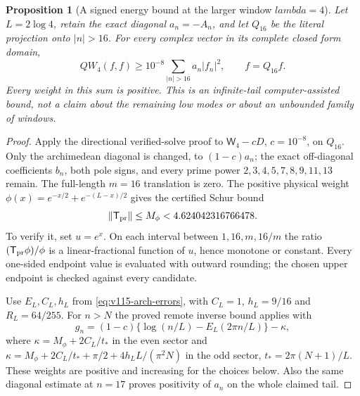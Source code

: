\documentclass[11pt]{article}
\def\lambda{lambda}%
\newtheorem{proposition}[theorem]{Proposition}
\theoremstyle{remark}
\begin{document}
\begin{proposition}[A signed energy bound at the larger window $\lambda=4$]
\label{prop:v120-lambda4-tail}
Let $L=2\log4$, retain the exact diagonal $a_n=-A_n$, and let
$Q_{16}$ be the literal projection onto $|n|>16$. For every complex
vector in its complete closed form domain,
\begin{equation}\label{eq:v120-lambda4-tail}
 QW_4(f,f)\ge10^{-8}\sum_{|n|>16}a_n|f_n|^2,
 \qquad f=Q_{16}f.
\end{equation}
Every weight in this sum is positive. This is an infinite-tail
computer-assisted bound, not a claim about the remaining low modes
or about an unbounded family of windows.
\end{proposition}
\begin{proof}
Apply the directional verified-solve proof to
$\mathsf W_4-cD$, $c=10^{-8}$, on $Q_{16}$.
Only the archimedean diagonal is changed, to $(1-c)a_n$;
the exact off-diagonal coefficients $b_n$, both pole signs, and every
prime power $2,3,4,5,7,8,9,11,13$ remain. The full-length $m=16$
translation is zero. The positive physical weight
$\phi(x)=e^{-x/2}+e^{-(L-x)/2}$ gives the certified Schur bound
\begin{equation}\label{eq:v120-lambda4-prime-bound}
 \|\mathsf T_{\rm pr}\|
 \le M_\phi<4.624042316766478.
\end{equation}
To verify it, set $u=e^x$. On each interval between
$1,16,m,16/m$ the ratio $(\mathsf T_{\rm pr}\phi)/\phi$
is a linear-fractional function of $u$, hence monotone or constant.
Every one-sided endpoint value is evaluated with outward rounding;
the chosen upper endpoint is checked against every candidate.

Use $E_L,C_L,h_L$ from \eqref{eq:v115-arch-errors}, with
$C_L=1$, $h_L=9/16$ and $R_L=64/255$. For $n>N$ the proved
remote inverse bound applies with
\[
 g_n=(1-c)\{\log(n/L)-E_L(2\pi n/L)\}-\kappa,
\]
where $\kappa=M_\phi+2C_L/t_*$ in the even sector and
$\kappa=M_\phi+2C_L/t_*+\pi/2+4h_LL/(\pi^2N)$ in the odd
sector, $t_*=2\pi(N+1)/L$. These weights are positive and
increasing for the choices below. Also the same diagonal estimate
at $n=17$ proves positivity of $a_n$ on the whole claimed tail.


\end{proof}
\end{document}
